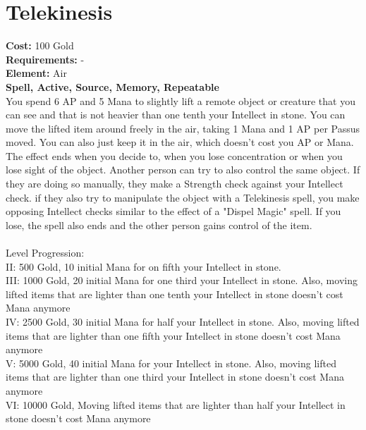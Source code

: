 \section{Telekinesis}
\textbf{Cost:} 100 Gold\\
\textbf{Requirements:} -\\
\textbf{Element:} Air\\
\textbf{Spell, Active, Source, Memory, Repeatable}\\
You spend 6 AP and 5 Mana to slightly lift a remote object or creature that you can see and that is not heavier than one tenth your Intellect in stone. You can move the lifted item around freely in the air, taking 1 Mana and 1 AP per Passus moved. You can also just keep it in the air, which doesn't cost you AP or Mana.\\
The effect ends when you decide to, when you lose concentration or when you lose sight of the object. Another person can try to also control the same object. If they are doing so manually, they make a Strength check against your Intellect check. if they also try to manipulate the object with a Telekinesis spell, you make opposing Intellect checks similar to the effect of a "Dispel Magic" spell. If you lose, the spell also ends and the other person gains control of the item.\\
\\
Level Progression:\\
II: 500 Gold, 10 initial Mana for on fifth your Intellect in stone.\\
III: 1000 Gold, 20 initial Mana for one third your Intellect in stone. Also, moving lifted items that are lighter than one tenth your Intellect in stone doesn't cost Mana anymore\\
IV: 2500 Gold, 30 initial Mana for half your Intellect in stone. Also, moving lifted items that are lighter than one fifth your Intellect in stone doesn't cost Mana anymore\\
V: 5000 Gold, 40 initial Mana for your Intellect in stone. Also, moving lifted items that are lighter than one third your Intellect in stone doesn't cost Mana anymore\\
VI: 10000 Gold, Moving lifted items that are lighter than half your Intellect in stone doesn't cost Mana anymore\\